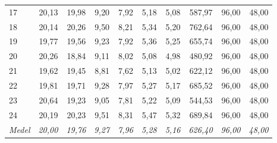 \begin{table}[H]
{\begin{tabular}{lrrrrrrrrr}
17 & 20{,}13 & 19{,}98 & 9{,}20 & 7{,}92 & 5{,}18 & 5{,}08 & 587{,}97 & 96{,}00 & 48{,}00 \\
18 & 20{,}14 & 20{,}26 & 9{,}50 & 8{,}21 & 5{,}34 & 5{,}20 & 762{,}64 & 96{,}00 & 48{,}00 \\
19 & 19{,}77 & 19{,}56 & 9{,}23 & 7{,}92 & 5{,}36 & 5{,}25 & 655{,}74 & 96{,}00 & 48{,}00 \\
20 & 20{,}26 & 18{,}84 & 9{,}11 & 8{,}02 & 5{,}08 & 4{,}98 & 480{,}92 & 96{,}00 & 48{,}00 \\
21 & 19{,}62 & 19{,}45 & 8{,}81 & 7{,}62 & 5{,}13 & 5{,}02 & 622{,}12 & 96{,}00 & 48{,}00 \\
22 & 19{,}81 & 19{,}71 & 9{,}28 & 7{,}97 & 5{,}27 & 5{,}17 & 685{,}52 & 96{,}00 & 48{,}00 \\
23 & 20{,}64 & 19{,}23 & 9{,}05 & 7{,}81 & 5{,}22 & 5{,}09 & 544{,}53 & 96{,}00 & 48{,}00 \\
24 & 20{,}19 & 20{,}23 & 9{,}51 & 8{,}31 & 5{,}47 & 5{,}32 & 689{,}84 & 96{,}00 & 48{,}00 \\
\hline
\textit{Medel} & \textit{20{,}00} & \textit{19{,}76} & \textit{9{,}27} & \textit{7{,}96} & \textit{5{,}28} & \textit{5{,}16} & \textit{626{,}40} & \textit{96{,}00} & \textit{48{,}00} \\
\hline
\end{tabular}
}
\end{table}








